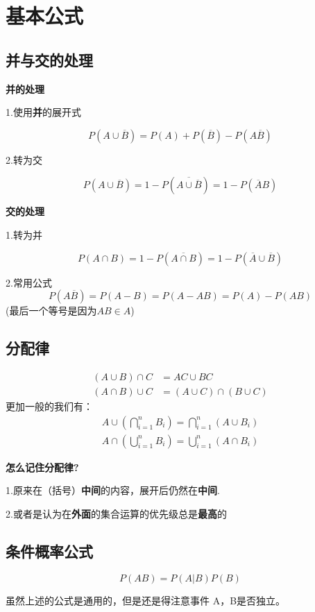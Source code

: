 \section{基本公式}
\subsection{并与交的处理}

\textbf{并的处理}

1.使用\textbf{并}的展开式

$$
P(A\cup\overline{B}) = P(A)+P(\overline{B})-P(A\overline{B})
$$

2.转为交

$$
P(A\cup\overline{B})= 1-P(\overline{A\cup\overline{B}}) = 1- P(\overline{A}B)
$$

\textbf{交的处理}

1.转为并

$$
P(A\cap B) =1 - P(\overline{A\cap B}) = 1 - P(\overline{A}\cup\overline{B})
$$

2.常用公式
$$
P(A\overline{B}) = P(A-B) = P(A-AB) = P(A) - P(AB)
$$ 
{\color{blue}(最后一个等号是因为$AB\in A$)}

\subsection{分配律}
\begin{align*}
(A\cup B)\cap C & = AC \cup BC\\
(A\cap B)\cup C & = (A\cup C) \cap (B\cup C)
\end{align*}
更加一般的我们有：
\begin{align}
A\cup\left(\bigcap_{i=1}^nB_i\right) = \bigcap_{i=1}^n(A\cup B_i)\\
A\cap\left(\bigcup_{i=1}^nB_i\right) = \bigcup_{i=1}^n(A\cap B_i)
\end{align}

{\bf 怎么记住分配律?}

{
    \kaishu
    1.原来在（括号）\textbf{中间}的内容，展开后仍然在\textbf{中间}.

    2.或者是认为在{\bf 外面}的集合运算的优先级总是{\bf 最高}的
}

\subsection{条件概率公式}

$$
P(AB)=P(A|B)P(B)
$$

虽然上述的公式是通用的，但是还是得注意事件 A，B是否独立。

